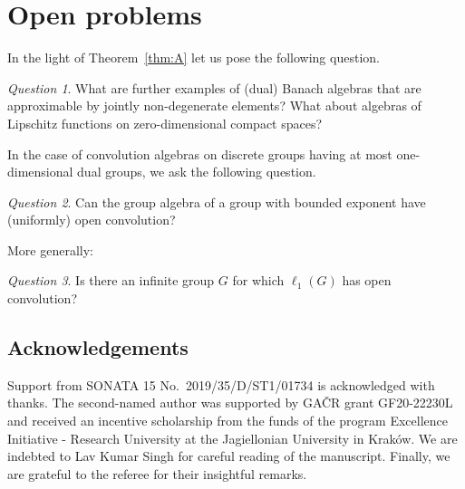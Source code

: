\documentclass[12pt,fleqn]{amsart}
\theoremstyle{definition}
\numberwithin{equation}{section}
\theoremstyle{remark}
\newtheorem{question}{Question}
\begin{document}
\section{Open problems}In the light of Theorem~\ref{thm:A} let us pose the following question.
%
\begin{question}
    What are further examples of (dual) Banach algebras that are approximable by jointly non-degenerate elements? What about algebras of Lipschitz functions on zero-dimensional compact spaces?
\end{question}
%
In the case of convolution algebras on discrete groups having at most one-dimensional dual groups, we ask the following question.
%
\begin{question}
    Can the group algebra of a group with bounded exponent have (uniformly) open convolution?
\end{question}
%
More generally:
%
\begin{question}
    Is there an infinite group $G$ for which $\ell_1(G)$ has open convolution?
\end{question}

\subsection*{Acknowledgements} Support from SONATA 15 No.~2019/35/D/ST1/01734 is acknowledged with thanks. The second-named author was supported by GAČR grant GF20-22230L and received an incentive scholarship from the funds of the program Excellence Initiative - Research University at the Jagiellonian University in Krak\'{o}w. We are indebted to Lav Kumar Singh for careful reading of the manuscript. Finally, we are grateful to the referee for their insightful remarks.




\end{document}
